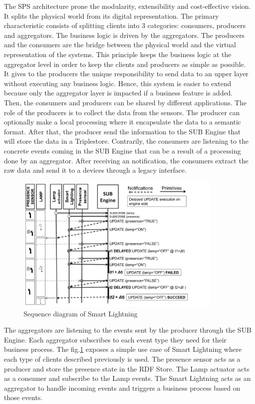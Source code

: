 \documentclass[11pt]{article}
\begin{document}
The SPS architecture prone the modularity, extensibility and cost-effective vision. It splits the physical world from its digital representation. The primary characteristic consists of splitting clients into 3 categories: consumers, producers and aggregators. The business logic is driven by the aggregators. The producers and the consumers are the bridge between the physical world and the virtual representation of the systems. This principle keeps the business logic at the aggregator level in order to keep the clients and producers as simple as possible. It gives to the producers the unique responsibility to send data to an upper layer without executing any business logic. Hence, this system is easier to extend because only the aggregator layer is impacted if a business feature is added. Then, the consumers and producers can be shared by different applications.
\newline
\newline
The role of the producers is to collect the data from the sensors. The producer can optionally make a local processing where it encapsulate the data to a semantic format. After that, the producer send the information to the SUB Engine that will store the data in a Triplestore.
Contrarily, the consumers are listening to the concrete events coming in the SUB Engine that can be a result of a processing done by an aggregator. After receiving an notification, the consumers extract the raw data and send it to a devices through a legacy interface.
\begin{figure}[H]
	\includegraphics[width=\textwidth,height=190pt]{assets/simple_SPS_example.png}
	\caption{Sequence diagram of Smart Lightning\cite{article_SPS}}
	\label{fig:Sequence-diagram-of-Smart-Lightning}
\end{figure}
The aggregators are listening to the events sent by the producer through the SUB Engine. Each aggregator subscribes to each event type they need for their business process. The fig.\ref{fig:Sequence-diagram-of-Smart-Lightning} exposes a simple use case of Smart Lightning where each type of clients described previously is used. The presence sensor acts as a producer and store the presence state in the RDF Store. The Lamp actuator acts as a consumer and subscribe to the Lamp events. The Smart Lightning acts as an aggregator to handle incoming events and triggers a business process based on those events.
\end{document}
